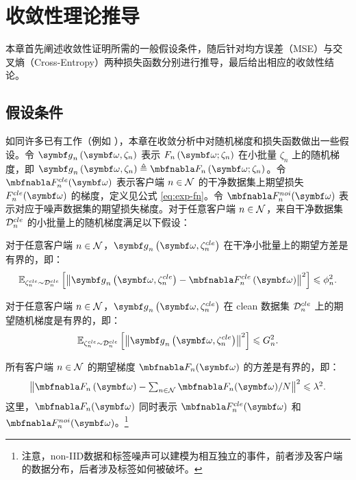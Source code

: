 
\section{收敛性理论推导}
本章首先阐述收敛性证明所需的一般假设条件，随后针对均方误差（MSE）与交叉熵（Cross-Entropy）两种损失函数分别进行推导，最后给出相应的收敛性结论。
\subsection{假设条件}
如同许多已有工作（例如 \cite{b4,b11,b8}），本章在收敛分析中对随机梯度和损失函数做出一些假设。令 $\gb_n\left(\omegab,\zeta_n\right)$ 表示 $F_n\left(\omegab;\zeta_n\right)$ 在小批量 $\zeta_n$ 上的随机梯度，即 $\gb_n\left(\omegab,\zeta_n\right)\triangleq \nabla F_n\left(\omegab;\zeta_n\right)$。令 $\nabla \fcle_n(\omegab)$ 表示客户端 $n\in\mathcal{N}$ 的干净数据集上期望损失 $\fcle_n(\omegab)$ 的梯度，定义见公式 \eqref{eq:exp-fn}。令 $\nabla \fnoi_n(\omegab)$ 表示对应于噪声数据集的期望损失梯度。对于任意客户端 $n\in\mathcal{N}$，来自干净数据集 $\mathcal{D}^{cle}_n$ 的小批量上的随机梯度满足以下假设：

\begin{assumption}[均方误差下随机梯度的方差]\label{ass:gradient-variance}
对于任意客户端 $n\in\mathcal{N}$，$\gb_n\left(\omegab,\zetacle_n\right)$ 在干净小批量上的期望方差是有界的，即：
\begin{equation}\label{eq:gradient-variance}
    \mathbb{E}_{\zetacle_n\sim \Dcle_n}\left[\left\Vert \gb_n\left(\omegab,\zetacle_n\right) - \nabla \fcle_n\left(\omegab\right) \right\Vert^2 \right] \leq \phi_n^2.
\end{equation}
\end{assumption}

\begin{assumption}[均方误差下的随机梯度]\label{ass:gradient}
对于任意客户端 $n\in\mathcal{N}$，$\gb_n\left(\omegab,\zetacle_n\right)$ 在 clean 数据集 $\mathcal{D}^{cle}_n$ 上的期望随机梯度是有界的，即：
\begin{equation}\label{eq:gradient}
\mathbb{E}_{\zetacle_n\sim \mathcal{D}_n^{cle}}\left[\left\Vert \gb_n\left(\omegab, \zetacle_n\right) \right\Vert^2\right] \leq G_n^2.
\end{equation}
\end{assumption}

\begin{assumption}[数据异构性]\label{ass:heter}
所有客户端 $n\in\mathcal{N}$ 的期望梯度 $\nabla \f_n(\boldsymbol{\omega})$ 的方差是有界的，即：
\begin{equation}
\textstyle \left\Vert 
\nabla \f_n\left(\boldsymbol{\omega}\right)- \sum_{n\in\N}
\nabla\f_n(\boldsymbol{\omega})/N \right\Vert^2 \le \lambda^2.
\end{equation}
这里，$\nabla \f_n(\boldsymbol{\omega})$ 同时表示 $\nabla \f_n^{cle}(\boldsymbol{\omega})$ 和 $\nabla \f_n^{noi}(\boldsymbol{\omega})$。\footnote{注意，non-IID数据和标签噪声可以建模为相互独立的事件，前者涉及客户端的数据分布，后者涉及标签如何被破坏。}
\end{assumption}

